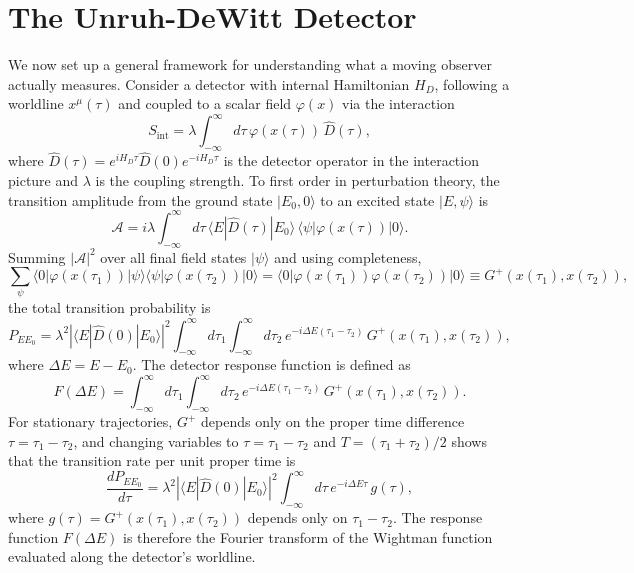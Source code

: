 \section{The Unruh-DeWitt Detector}

We now set up a general framework for understanding what a moving
observer actually measures. Consider a detector with internal
Hamiltonian $H_D$, following a worldline $x^\mu(\tau)$ and coupled to
a scalar field $\varphi(x)$ via the interaction
\begin{equation}
	S_{\text{int}} = \lambda\int_{-\infty}^{\infty}d\tau\,
	\varphi(x(\tau))\,\hat D(\tau),
\end{equation}
where $\hat D(\tau) = e^{iH_D\tau}\hat D(0)e^{-iH_D\tau}$ is the
detector operator in the interaction picture and $\lambda$ is the
coupling strength. To first order in perturbation theory, the
transition amplitude from the ground state $|E_0,0\rangle$ to an
excited state $|E,\psi\rangle$ is
\begin{equation}
	\mathcal{A} = i\lambda\int_{-\infty}^{\infty}d\tau\,
	\langle E|\hat D(\tau)|E_0\rangle\,
	\langle\psi|\varphi(x(\tau))|0\rangle.
\end{equation}
Summing $|\mathcal{A}|^2$ over all final field states $|\psi\rangle$
and using completeness,
\begin{equation}
	\sum_\psi\langle 0|\varphi(x(\tau_1))|\psi\rangle
	\langle\psi|\varphi(x(\tau_2))|0\rangle
	= \langle 0|\varphi(x(\tau_1))\varphi(x(\tau_2))|0\rangle
	\equiv G^+(x(\tau_1),x(\tau_2)),
\end{equation}
the total transition probability is
\begin{equation}
	P_{EE_0} = \lambda^2
	\left|\langle E|\hat D(0)|E_0\rangle\right|^2
	\int_{-\infty}^{\infty}d\tau_1\int_{-\infty}^{\infty}d\tau_2\,
	e^{-i\Delta E(\tau_1-\tau_2)}\,
	G^+(x(\tau_1),x(\tau_2)),
\end{equation}
where $\Delta E = E - E_0$. The detector response function is defined
as
\begin{equation}
	F(\Delta E) = \int_{-\infty}^{\infty}d\tau_1
	\int_{-\infty}^{\infty}d\tau_2\,
	e^{-i\Delta E(\tau_1-\tau_2)}\,
	G^+(x(\tau_1),x(\tau_2)).
\end{equation}
For stationary trajectories, $G^+$ depends only on the proper time
difference $\tau = \tau_1 - \tau_2$, and changing variables to
$\tau = \tau_1 - \tau_2$ and $T = (\tau_1+\tau_2)/2$ shows that the
transition rate per unit proper time is
\begin{equation}
	\frac{dP_{EE_0}}{d\tau}
	= \lambda^2\left|\langle E|\hat D(0)|E_0\rangle\right|^2
	\int_{-\infty}^{\infty}d\tau\,e^{-i\Delta E\tau}\,g(\tau),
\end{equation}
where $g(\tau) = G^+(x(\tau_1),x(\tau_2))$ depends only on
$\tau_1-\tau_2$. The response function $F(\Delta E)$ is therefore the
Fourier transform of the Wightman function evaluated along the
detector's worldline.

